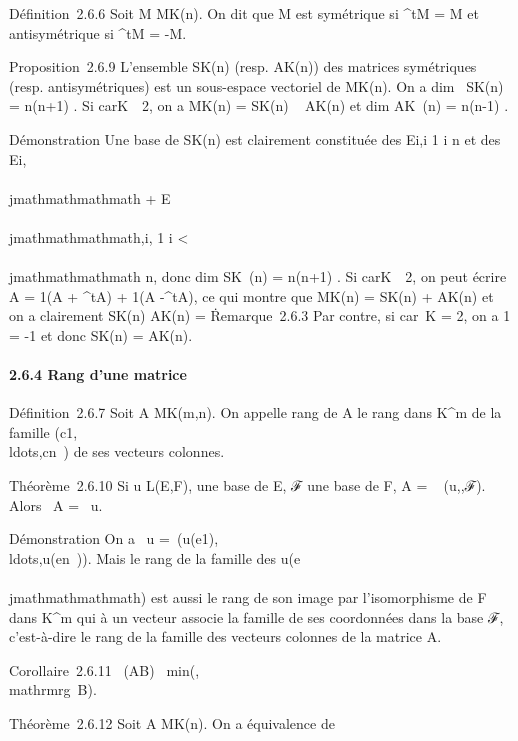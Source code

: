 Définition~2.6.6 Soit M \in MK(n). On dit que M est symétrique
si ^tM = M et antisymétrique si ^tM = -M.

Proposition~2.6.9 L'ensemble SK(n) (resp. AK(n)) des
matrices symétriques (resp. antisymétriques) est un sous-espace
vectoriel de MK(n). On a dim~
SK(n) = n(n+1)  . Si
carK\mathrel\neq~~2, on a
MK(n) = SK(n) \oplus~ AK(n) et
dim AK~(n) = n(n-1)
 .

Démonstration Une base de SK(n) est clairement constituée des
Ei,i 1 \leq i \leq n et des Ei,\\\\jmathmathmathmath + E\\\\jmathmathmathmath,i, 1 \leq i
\textless{} \\\\jmathmathmathmath \leq n, donc dim SK~(n)
= n(n+1)  . Si
carK\mathrel\neq~~2, on peut
écrire A = 1(A + ^tA) +
1(A -^tA), ce qui montre que
MK(n) = SK(n) + AK(n) et on a clairement
SK(n) \bigcap AK(n) =
\0\.

Remarque~2.6.3 Par contre, si car~K = 2, on a 1
= -1 et donc SK(n) = AK(n).

\paragraph{2.6.4 Rang d'une matrice}

Définition~2.6.7 Soit A \in MK(m,n). On appelle rang de A le
rang dans K^m de la famille
(c1,\\ldots,cn~)
de ses vecteurs colonnes.

Théorème~2.6.10 Si u \in L(E,F),  une base de E, ℱ une base de F, A
= \mathrmMat~ (u,,ℱ). Alors
\mathrmrg~A
= \mathrmrg~u.

Démonstration On a
\mathrmrg~u
=\
\mathrmrg(u(e1),\\ldots,u(en~)).
Mais le rang de la famille des u(e\\\\jmathmathmathmath) est aussi le rang de son
image par l'isomorphisme de F dans K^m qui à un vecteur
associe la famille de ses coordonnées dans la base ℱ, c'est-à-dire le
rang de la famille des vecteurs colonnes de la matrice A.

Corollaire~2.6.11
\mathrmrg~(AB)
\leq\
min(\mathrmrgA,\\mathrmrg~B).

Théorème~2.6.12 Soit A \in MK(n). On a équivalence de

